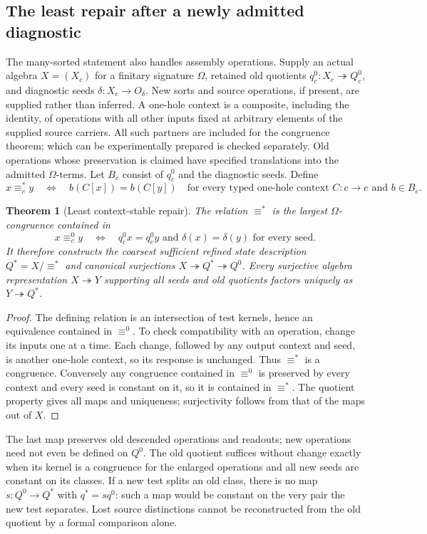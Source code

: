 \documentclass[11pt]{article}
\newtheorem{theorem}{Theorem}[section]
\theoremstyle{definition}
\theoremstyle{remark}\newtheorem{remark}[theorem]{Remark}
\begin{document}
\subsection{The least repair after a newly admitted diagnostic}
The many-sorted statement also handles assembly operations. Supply an actual
algebra $X=(X_c)$ for a finitary signature $\Omega$, retained old quotients
$q^0_c:X_c\twoheadrightarrow Q^0_c$, and diagnostic seeds
$\delta:X_c\to O_\delta$. New sorts and source operations, if present,
are supplied rather than inferred. A one-hole context is a composite, including the identity, of
operations with all other inputs fixed at arbitrary elements of the
supplied source carriers. All such partners are included for the congruence
theorem; which can be experimentally prepared is checked separately.
Old operations whose preservation is claimed have specified translations
into the admitted $\Omega$-terms.
Let $B_c$ consist of $q^0_c$ and the diagnostic seeds. Define
\[
 x\equiv^*_cy\quad\Longleftrightarrow\quad
 b(C[x])=b(C[y])\quad\text{for every typed one-hole context }C:c\to e
 \text{ and }b\in B_e.
\]
\begin{theorem}[Least context-stable repair]\label{thm:repair}
The relation $\equiv^*$ is the largest $\Omega$-congruence contained in
\[
 x\equiv^0_cy\quad\Longleftrightarrow\quad
 q^0_cx=q^0_cy\text{ and }\delta(x)=\delta(y)\text{ for every seed}.
\]
It therefore constructs the coarsest sufficient refined state description
$Q^*=X/{\equiv^*}$ and canonical surjections
$X\twoheadrightarrow Q^*\twoheadrightarrow Q^0$.
Every surjective algebra representation $X\twoheadrightarrow Y$ supporting
all seeds and old quotients factors uniquely as
$Y\twoheadrightarrow Q^*$.
\end{theorem}
\begin{proof}
The defining relation is an intersection of test kernels, hence an
equivalence contained in $\equiv^0$. To check compatibility with an operation,
change its inputs one at a time. Each change, followed by any output context
and seed, is another one-hole context, so its response is unchanged. Thus
$\equiv^*$ is a congruence. Conversely any congruence contained in
$\equiv^0$ is preserved by every context and every seed is constant on it,
so it is contained in $\equiv^*$. The quotient property gives all maps and
uniqueness; surjectivity follows from that of the maps out of $X$.
\end{proof}
The last map preserves old descended operations and readouts; new operations
need not even be defined on $Q^0$. The old quotient suffices without change
exactly when its kernel is a congruence for the enlarged operations and all
new seeds are constant on its classes. If a new test splits an old class,
there is no map $s:Q^0\to Q^*$ with $q^*=s q^0$: such a map would be
constant on the very pair the new test separates. Lost source distinctions
cannot be reconstructed from the old quotient by a formal comparison alone.
\end{document}
